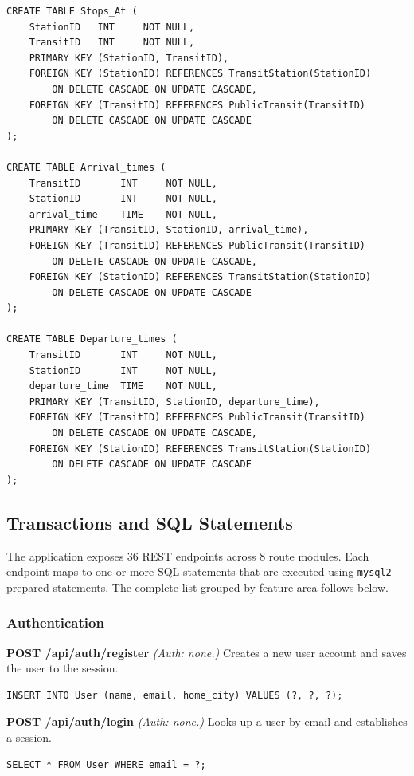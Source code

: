 \begin{lstlisting}[language=MySQL,caption={Full database schema (DDL).},label={lst:ddl}]
CREATE TABLE Stops_At (
    StationID   INT     NOT NULL,
    TransitID   INT     NOT NULL,
    PRIMARY KEY (StationID, TransitID),
    FOREIGN KEY (StationID) REFERENCES TransitStation(StationID)
        ON DELETE CASCADE ON UPDATE CASCADE,
    FOREIGN KEY (TransitID) REFERENCES PublicTransit(TransitID)
        ON DELETE CASCADE ON UPDATE CASCADE
);

CREATE TABLE Arrival_times (
    TransitID       INT     NOT NULL,
    StationID       INT     NOT NULL,
    arrival_time    TIME    NOT NULL,
    PRIMARY KEY (TransitID, StationID, arrival_time),
    FOREIGN KEY (TransitID) REFERENCES PublicTransit(TransitID)
        ON DELETE CASCADE ON UPDATE CASCADE,
    FOREIGN KEY (StationID) REFERENCES TransitStation(StationID)
        ON DELETE CASCADE ON UPDATE CASCADE
);

CREATE TABLE Departure_times (
    TransitID       INT     NOT NULL,
    StationID       INT     NOT NULL,
    departure_time  TIME    NOT NULL,
    PRIMARY KEY (TransitID, StationID, departure_time),
    FOREIGN KEY (TransitID) REFERENCES PublicTransit(TransitID)
        ON DELETE CASCADE ON UPDATE CASCADE,
    FOREIGN KEY (StationID) REFERENCES TransitStation(StationID)
        ON DELETE CASCADE ON UPDATE CASCADE
);
\end{lstlisting}

\subsection{Transactions and SQL Statements}

The application exposes 36 REST endpoints across 8 route modules. Each endpoint maps to one or more SQL statements that are executed using \texttt{mysql2} prepared statements. The complete list grouped by feature area follows below.

\subsubsection{Authentication}

\textbf{POST /api/auth/register} \textit{(Auth: none.)}
Creates a new user account and saves the user to the session.
\begin{lstlisting}[language=MySQL]
INSERT INTO User (name, email, home_city) VALUES (?, ?, ?);
\end{lstlisting}

\textbf{POST /api/auth/login} \textit{(Auth: none.)}
Looks up a user by email and establishes a session.
\begin{lstlisting}[language=MySQL]
SELECT * FROM User WHERE email = ?;
\end{lstlisting}


